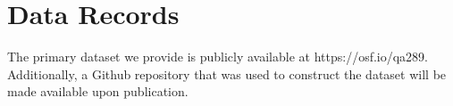 \documentclass[fleqn,10pt]{wlscirep}
\begin{document}





 

\section*{Data Records}

The primary dataset we provide is publicly available at https://osf.io/qa289. Additionally, a Github repository that was used to construct the dataset will be made available upon publication. 

\end{document}
